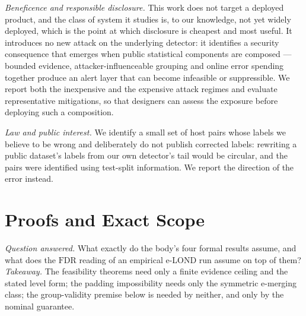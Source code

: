 \documentclass[conference]{IEEEtran}
\newcommand{\FDR}{\mathrm{FDR}}
\begin{document}
\emph{Beneficence and responsible disclosure.} This work does not target a deployed product, and the
class of system it studies is, to our knowledge, not yet widely deployed, which is the point at which
disclosure is cheapest and most useful. It introduces no new attack on the underlying detector: it
identifies a security consequence that emerges when public statistical components are composed ---
bounded evidence, attacker-influenceable grouping and online error spending together produce an alert
layer that can become infeasible or suppressible. We report both the inexpensive and the expensive
attack regimes and evaluate representative mitigations, so that designers can assess the exposure
before deploying such a composition.

\emph{Law and public interest.} We identify a small set of host pairs whose labels we believe to be wrong
and deliberately do not publish corrected labels: rewriting a public dataset's labels from our own
detector's tail would be circular, and the pairs were identified using test-split information. We report
the direction of the error instead.




\appendices

\section{Proofs and Exact Scope}\label{app:proofs}

\emph{Question answered.} What exactly do the body's four formal results assume, and what does the
$\FDR$ reading of an empirical e-LOND run assume on top of them? \emph{Takeaway.} The feasibility
theorems need only a finite evidence ceiling and the stated level form; the padding impossibility needs
only the symmetric e-merging class; the group-validity premise below is needed by neither, and only by
the nominal guarantee.
\end{document}
